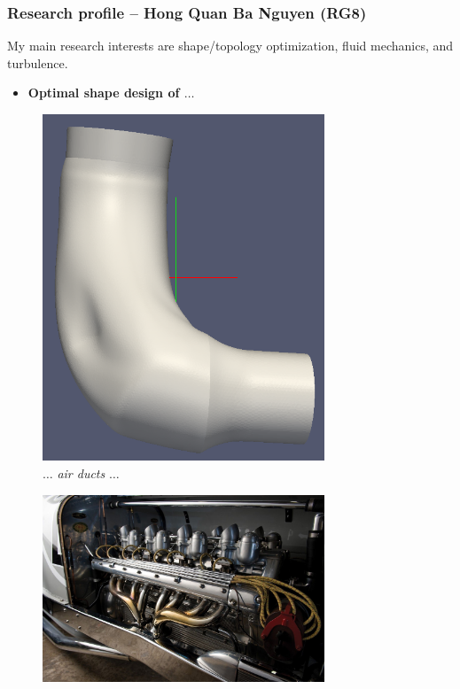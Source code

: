 \documentclass[english,aspectratio=169]{beamer}
\begin{document}
\begin{frame}
  \frametitle{Research profile -- Hong Quan Ba Nguyen (RG8)}
  \vspace{-0cm}
  My main research interests are \textcolor{wiasblue}{shape/topology optimization}, \textcolor{wiasblue}{fluid mechanics}, and \textcolor{wiasblue}{turbulence}.
  \begin{minipage}{0.49\linewidth}
    \vspace{0.2cm}
    \begin{itemize}
    \item \textbf{\textcolor{wiasblue}{Optimal shape design of $\ldots$}}
    \end{itemize}
    \vspace{-0cm}
    \begin{minipage}{0.45\linewidth}
      \begin{figure}
          \includegraphics[width=0.75\textwidth]{tube_iteration_30}
          \vspace{-0.4cm}
          \caption{\footnotesize{$\ldots$ \textcolor{wiasblue}{\emph{air ducts}} $\ldots$}}
      \end{figure}
      \vspace{-1cm}
      \begin{figure}
          \vspace{0.2cm}
          \includegraphics[width=0.75\textwidth]{Combustion_Engines_1}

\end{figure}
\end{minipage}
\end{minipage}
\end{frame}
\end{document}
